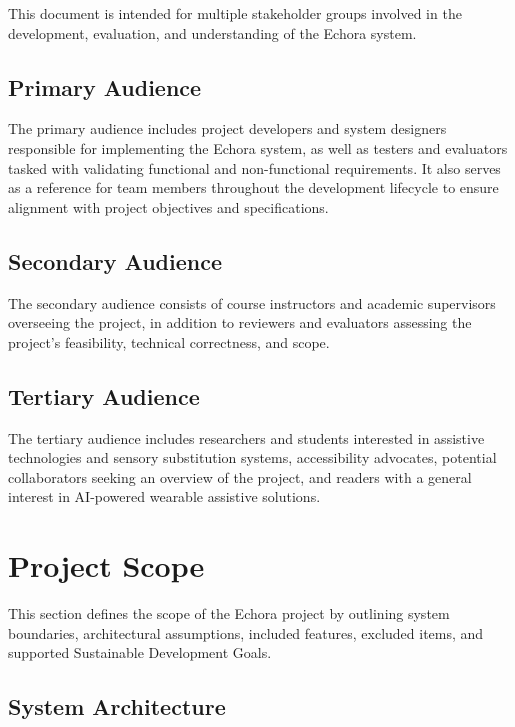 This document is intended for multiple stakeholder groups involved in the development, evaluation, and understanding of the Echora system.

\subsection{Primary Audience}
\label{subsubsec:primary_audience}

The primary audience includes project developers and system designers responsible for implementing the Echora system, as well as testers and evaluators tasked with validating functional and non-functional requirements. It also serves as a reference for team members throughout the development lifecycle to ensure alignment with project objectives and specifications.

\subsection{Secondary Audience}
\label{subsubsec:secondary_audience}

The secondary audience consists of course instructors and academic supervisors overseeing the project, in addition to reviewers and evaluators assessing the project’s feasibility, technical correctness, and scope.

\subsection{Tertiary Audience}
\label{subsubsec:tertiary_audience}

The tertiary audience includes researchers and students interested in assistive technologies and sensory substitution systems, accessibility advocates, potential collaborators seeking an overview of the project, and readers with a general interest in AI-powered wearable assistive solutions.

\section{Project Scope}

This section defines the scope of the Echora project by outlining system boundaries, architectural assumptions, included features, excluded items, and supported Sustainable Development Goals.

\subsection{System Architecture}
\label{subsubsec:system_architecture}

